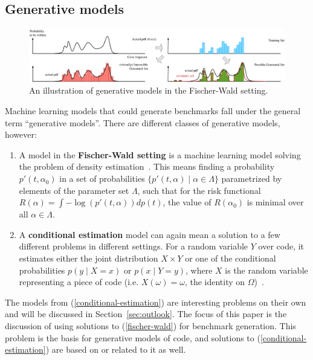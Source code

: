 \subsection{Generative models}
\label{sec:generative}

\begin{figure}[th]
	\centering
	\includegraphics[width=\textwidth]{figures/illustration_histograms_ideal.pdf}
	\caption{An illustration of generative models in the Fischer-Wald setting.}
	\label{fig:histograms}
\end{figure}

Machine learning models that could generate benchmarks fall under the general term ``generative models''.
There are different classes of generative models, however:
\begin{enumerate}
\item \label{fischer-wald} A model in the \textbf{Fischer-Wald setting} is a machine learning model solving the problem of density estimation~\cite{vapnik}. This means finding a probability $p'(t,\alpha_0)$ in a set of probabilities $\{ p'(t,\alpha) \mid \alpha \in \Lambda \}$ parametrized by elements of the parameter set $\Lambda$,
  such that for the risk functional $R(\alpha) = \int -\log(p'(t,\alpha)) dp(t)$, the value of $R(\alpha_0)$ is minimal over all $\alpha \in \Lambda$.
\item \label{conditional-estimation} A \textbf{conditional estimation} model can again mean a solution to a few different problems in different settings. For a random variable $Y$ over code, it estimates either the joint distribution $X \times Y$ or one of the conditional probabilities $p(y \mid X = x)$ or $p(x \mid Y = y)$, where $X$ is the random variable representing a piece of code (i.e. $X(\omega) = \omega$, the identity on $\Omega$)~\cite{vapnik}.

\end{enumerate}

The models from (\ref{conditional-estimation}) are interesting problems on their own and will be discussed in Section~\ref{sec:outlook}.
The focus of this paper is the discussion of using solutions to (\ref{fischer-wald}) for benchmark generation.
This problem is the basis for generative models of code, and solutions to (\ref{conditional-estimation}) are based on or related to it as well.

